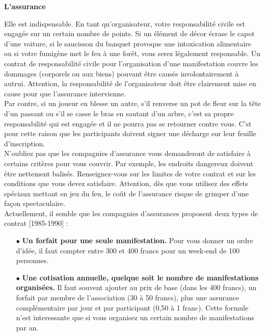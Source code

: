 \documentclass[11pt,twoside,a4paper]{article}
\begin{document}
\begin{multicols*}{2}
\vfill
\clearpage

\textbf{\large L'assurance} %

Elle est indispensable. En tant qu'organisateur, votre responsabilit{\'e} civile est engag{\'e}e sur un certain nombre de points. Si un {\'e}l{\'e}ment de d{\'e}cor {\'e}crase le capot d'une voiture, si le saucisson du banquet provoque une intoxication alimentaire ou si votre fumig{\`e}ne met le feu {\`a} une for{\^e}t, vous serez l{\'e}galement responsable. Un contrat de responsabilit{\'e} civile pour l'organisation d'une manifestation couvre les dommages (corporels ou aux biens) pouvant {\^e}tre caus{\'e}s involontairement {\`a} autrui. Attention, la responsabilit{\'e} de l'organisateur doit {\^e}tre clairement mise en cause pour que l'assurance intervienne. ~\\

Par contre, si un joueur en blesse un autre, s'il renverse un pot de fleur sur la t{\^e}te d'un passant ou s'il se casse le bras en sautant d'un arbre, c'est sa propre responsabilit{\'e} qui est engag{\'e}e et il ne pourra pas se retourner contre vous. C'st pour cette raison que les participants doivent signer une d{\'e}charge sur leur feuille d'inscription. ~\\

N'oubliez pas que les compagnies d'assurance vous demanderont de satisfaire {\`a} certains crit{\`e}res pour vous couvrir. Par exemple, les endroits dangereux doivent {\^e}tre nettement balis{\'e}s. Renseignez-vous sur les limites de votre contrat et sur les conditions que vous devez satisfaire. Attention, d{\`e}s que vous utilisez des effets sp{\'e}ciaux mettant en jeu du feu, le co{\^u}t de l'assurance risque de grimper d'une fa\c{c}on spectaculaire. ~\\

Actuellement, il semble que les compagnies d'assurances proposent deux types de contrat [1985-1990] : 
\begin{itemize}
	\item[$\bullet$] \textbf{Un forfait pour une seule manifestation. }Pour vous donner un ordre d'id{\'e}e, il faut compter entre 300 et 400 francs pour un week-end de 100 personnes. 
	\item[$\bullet$] \textbf{Une cotisation annuelle, quelque soit le nombre de manifestations organis{\'e}es. }Il faut souvent ajouter au prix de base (dans les 400 francs), un forfait par membre de l'association (30 {\`a} 50 francs), plus une assurance compl{\'e}mentaire par jour et par participant (0,50 {\`a} 1 franc). Cette formule n'est interessante que si vous organisez un certain nombre de manifestations par an. 
\end{itemize}


\end{multicols*}
\end{document}
